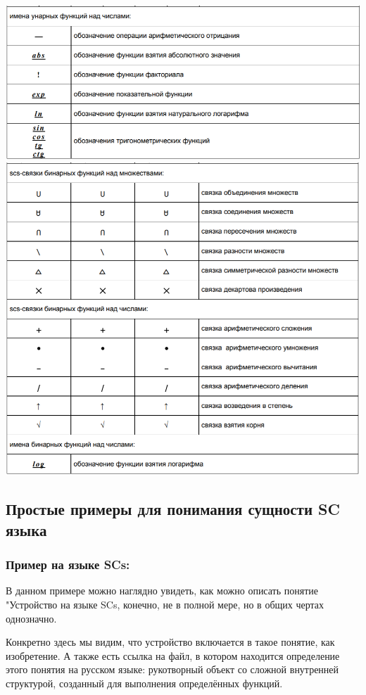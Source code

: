  \includegraphics[scale=0.48]{images/sc8.png}
 \includegraphics[scale=0.48]{images/sc9.png}
 
 \subsection{Простые примеры для понимания сущности SC языка}
 \subsubsection{Пример на языке SCs:}
 
 В данном примере можно наглядно увидеть, как можно описать понятие "Устройство на языке SCs, конечно, не в полной мере, но в общих чертах однозначно.
 
Конкретно здесь мы видим, что устройство включается в такое понятие, как изобретение. А также есть ссылка на файл, в котором находится определение этого понятия на русском языке: рукотворный объект со сложной внутренней структурой, 
созданный для выполнения определённых функций.
  
